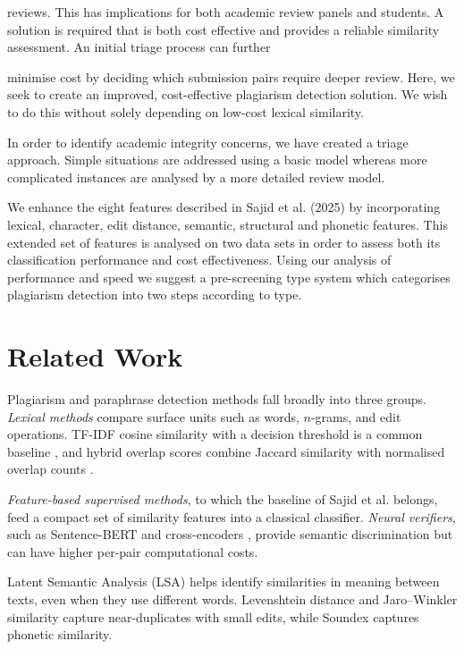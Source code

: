 \documentclass[conference]{IEEEtran}
\begin{document}
reviews. This has implications for both academic review panels and
students.
A solution is required that is both cost effective and provides a
reliable similarity assessment. An initial triage process can further

minimise cost by deciding which submission pairs require deeper
review. Here, we seek to create an improved, cost-effective
plagiarism detection solution. We wish to do this without solely
depending on low-cost lexical similarity.

In order to identify academic integrity concerns, we have created a
triage approach. Simple situations are addressed using a basic model
whereas more complicated instances are analysed by a more detailed
review model.

We enhance the eight features described in Sajid et al. (2025) \cite{sajid2025} by
incorporating lexical, character, edit distance, semantic,
structural and phonetic features. This extended set of features is
analysed on two data sets in order to assess both its classification
performance and cost effectiveness. Using our analysis of performance
and speed we suggest a pre-screening type system which categorises
plagiarism detection into two steps according to type.


\section{Related Work}

Plagiarism and paraphrase detection methods fall broadly into three
groups. \emph{Lexical methods} compare surface units such as words,
$n$-grams, and edit operations. TF-IDF cosine similarity with a
decision threshold is a common baseline \cite{amirzhanov2025}, and
hybrid overlap scores combine Jaccard similarity with normalised
overlap counts \cite{singh2026}.

\emph{Feature-based supervised methods}, to which the baseline of
Sajid et al. \cite{sajid2025} belongs, feed a compact set of
similarity features into a classical classifier. \emph{Neural
verifiers}, such as Sentence-BERT and cross-encoders \cite{reimers2019},
provide semantic discrimination but can have higher per-pair
computational costs.

Latent Semantic Analysis (LSA) \cite{deerwester1990} helps identify
similarities in meaning between texts, even when they use different
words. Levenshtein distance \cite{levenshtein1966} and Jaro--Winkler
similarity \cite{winkler1990} capture near-duplicates with small
edits, while Soundex \cite{russell1918} captures phonetic similarity.
\end{document}
